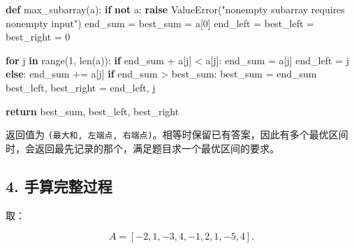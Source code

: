 \documentclass[
  UTF8,fontset=none,zihao=5]{ctexart}
\newenvironment{Shaded}{}{}
\newcommand{\BuiltInTok}[1]{#1}
\newcommand{\ControlFlowTok}[1]{\textcolor[rgb]{0.00,0.44,0.13}{\textbf{#1}}}
\newcommand{\DecValTok}[1]{\textcolor[rgb]{0.25,0.63,0.44}{#1}}
\newcommand{\KeywordTok}[1]{\textcolor[rgb]{0.00,0.44,0.13}{\textbf{#1}}}
\newcommand{\NormalTok}[1]{#1}
\newcommand{\OperatorTok}[1]{\textcolor[rgb]{0.40,0.40,0.40}{#1}}
\newcommand{\PreprocessorTok}[1]{\textcolor[rgb]{0.74,0.48,0.00}{#1}}
\newcommand{\StringTok}[1]{\textcolor[rgb]{0.25,0.44,0.63}{#1}}
\renewenvironment{Shaded}{\begin{snugshade}}{\end{snugshade}}
\let\OldSubsection\subsection
\renewcommand{\subsection}{\Needspace{4\baselineskip}\OldSubsection}
\begin{document}
\Needspace{186pt}

\begin{Shaded}
\begin{Highlighting}[]
\KeywordTok{def}\NormalTok{ max\_subarray(a):}
    \ControlFlowTok{if} \KeywordTok{not}\NormalTok{ a:}
        \ControlFlowTok{raise} \PreprocessorTok{ValueError}\NormalTok{(}\StringTok{"nonempty subarray requires nonempty input"}\NormalTok{)}
\NormalTok{    end\_sum }\OperatorTok{=}\NormalTok{ best\_sum }\OperatorTok{=}\NormalTok{ a[}\DecValTok{0}\NormalTok{]}
\NormalTok{    end\_left }\OperatorTok{=}\NormalTok{ best\_left }\OperatorTok{=}\NormalTok{ best\_right }\OperatorTok{=} \DecValTok{0}

    \ControlFlowTok{for}\NormalTok{ j }\KeywordTok{in} \BuiltInTok{range}\NormalTok{(}\DecValTok{1}\NormalTok{, }\BuiltInTok{len}\NormalTok{(a)):}
        \ControlFlowTok{if}\NormalTok{ end\_sum }\OperatorTok{+}\NormalTok{ a[j] }\OperatorTok{\textless{}}\NormalTok{ a[j]:}
\NormalTok{            end\_sum }\OperatorTok{=}\NormalTok{ a[j]}
\NormalTok{            end\_left }\OperatorTok{=}\NormalTok{ j}
        \ControlFlowTok{else}\NormalTok{:}
\NormalTok{            end\_sum }\OperatorTok{+=}\NormalTok{ a[j]}
        \ControlFlowTok{if}\NormalTok{ end\_sum }\OperatorTok{\textgreater{}}\NormalTok{ best\_sum:}
\NormalTok{            best\_sum }\OperatorTok{=}\NormalTok{ end\_sum}
\NormalTok{            best\_left, best\_right }\OperatorTok{=}\NormalTok{ end\_left, j}

    \ControlFlowTok{return}\NormalTok{ best\_sum, best\_left, best\_right}
\end{Highlighting}
\end{Shaded}

返回值为
\texttt{(最大和,\ 左端点,\ 右端点)}。相等时保留已有答案，因此有多个最优区间时，会返回最先记录的那个，满足题目求一个最优区间的要求。

\hypertarget{ux624bux7b97ux5b8cux6574ux8fc7ux7a0b}{%
\subsection{4.
手算完整过程}\label{ux624bux7b97ux5b8cux6574ux8fc7ux7a0b}}

取：

\[
A=[-2,1,-3,4,-1,2,1,-5,4].
\]
\end{document}
